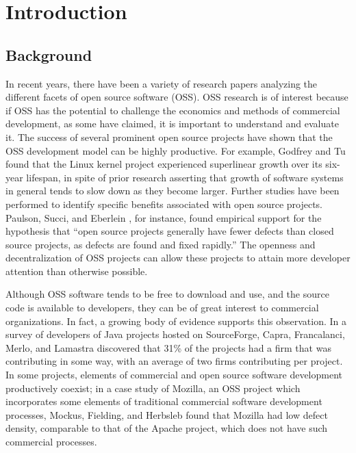 \chapter{Introduction}
\section{Background}
In recent years, there have been a variety of research papers analyzing the different facets of open source software (OSS). OSS research is of interest because if OSS has the potential to challenge the economics and methods of commercial development, 
as some have claimed, it is important to understand and evaluate it\cite{mockus2002two}. The success of several prominent open source projects have shown that the OSS development model can be highly productive. For example, Godfrey and Tu \cite{godfrey2000evolution} found that the Linux kernel project experienced superlinear growth over its six-year lifespan, in spite of prior research asserting that growth of software systems in general tends to slow down as they become larger. Further studies have been performed to identify specific benefits associated with open source projects. Paulson, Succi, and Eberlein \cite{paulson2004empirical}, for instance, found empirical support for the hypothesis that ``open source projects generally have fewer defects than closed source projects, as defects are found and fixed rapidly.'' The openness and decentralization of OSS projects can allow these projects to attain more developer attention than otherwise possible.

Although OSS software tends to be free to download and use, and the source code
is available to developers, 
 they can be of great interest to
 commercial organizations. In fact, a growing body of evidence supports this observation.
  In a survey of developers of Java projects hosted on SourceForge, Capra, Francalanci, Merlo, and Lamastra discovered that 31\% of the projects had a firm that was contributing in some way, with an average of two firms contributing per project\cite{capra2009survey}. In some projects, elements of commercial and open source software development productively coexist; in a case study of Mozilla, an OSS project which incorporates some elements of traditional commercial software development processes, Mockus, Fielding, and Herbsleb \cite{mockus2002two} found that Mozilla had low defect density, comparable to that of the Apache project, which does not have such commercial processes.

